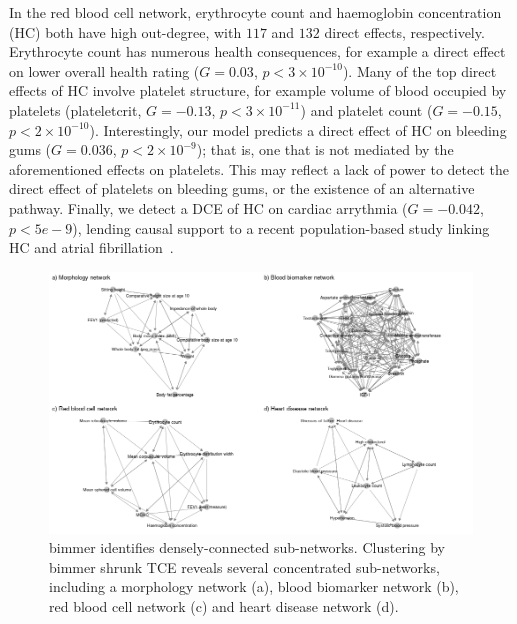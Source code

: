\documentclass{article}
\begin{document}
In the red blood cell network, erythrocyte count and haemoglobin concentration (HC)
both have high out-degree, with $117$ and $132$ direct effects, respectively.
Erythrocyte count has numerous health consequences,
for example a direct effect on lower overall health rating ($G = 0.03$, $p < 3 \times 10^{-10}$).
Many of the top direct effects of HC involve platelet structure,
for example volume of blood occupied by platelets (plateletcrit, $G = -0.13$, $p < 3 \times 10^{-11}$)
and platelet count
($G = -0.15$, $p < 2 \times 10^{-10}$). Interestingly, our model predicts a direct effect of
HC on bleeding gums ($G = 0.036$, $p < 2 \times 10^{-9}$); that is, one
that is not mediated by the aforementioned effects on platelets. This may reflect a lack of power to detect
the direct effect of platelets on bleeding gums, or the existence of an alternative pathway.
Finally, we detect a DCE of HC on cardiac arrythmia ($G = -0.042$, $p < 5e-9$), lending causal
support to a recent population-based study linking HC and atrial fibrillation~\cite{Lim2020}.


\begin{figure}
\includegraphics[width=\textwidth]{figures/figure5b.png}
\caption{bimmer identifies densely-connected sub-networks.
Clustering by bimmer shrunk TCE reveals
several concentrated sub-networks, including a morphology network (a), blood biomarker
network (b), red blood cell network (c) and heart disease network (d).}
\label{figure5b}
\end{figure}
\end{document}
